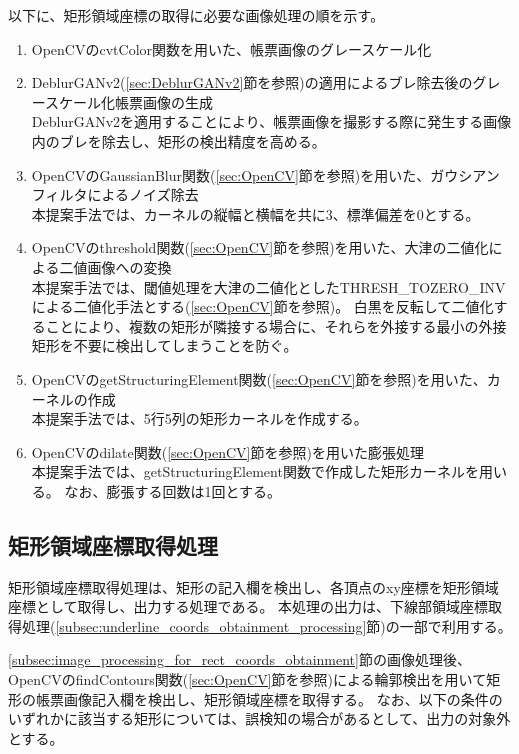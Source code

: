 以下に、矩形領域座標の取得に必要な画像処理の順を示す。

\begin{enumerate}
    \item OpenCVのcvtColor関数を用いた、帳票画像のグレースケール化
    \item DeblurGANv2(\ref{sec:DeblurGANv2}節を参照)の適用によるブレ除去後のグレースケール化帳票画像の生成\\
        DeblurGANv2を適用することにより、帳票画像を撮影する際に発生する画像内のブレを除去し、矩形の検出精度を高める。
    \item OpenCVのGaussianBlur関数(\ref{sec:OpenCV}節を参照)を用いた、ガウシアンフィルタによるノイズ除去\\
        本提案手法では、カーネルの縦幅と横幅を共に3、標準偏差を0とする。
    \item OpenCVのthreshold関数(\ref{sec:OpenCV}節を参照)を用いた、大津の二値化による二値画像への変換\\
        本提案手法では、閾値処理を大津の二値化としたTHRESH\_TOZERO\_INVによる二値化手法とする(\ref{sec:OpenCV}節を参照)。
        白黒を反転して二値化することにより、複数の矩形が隣接する場合に、それらを外接する最小の外接矩形を不要に検出してしまうことを防ぐ。
    \item OpenCVのgetStructuringElement関数(\ref{sec:OpenCV}節を参照)を用いた、カーネルの作成\\
        本提案手法では、5行5列の矩形カーネルを作成する。
    \item OpenCVのdilate関数(\ref{sec:OpenCV}節を参照)を用いた膨張処理\\
        本提案手法では、getStructuringElement関数で作成した矩形カーネルを用いる。
        なお、膨張する回数は1回とする。
\end{enumerate}


\subsection{矩形領域座標取得処理}\label{subsec:rect_coords_obtainment_processing}
矩形領域座標取得処理は、矩形の記入欄を検出し、各頂点のxy座標を矩形領域座標として取得し、出力する処理である。
本処理の出力は、下線部領域座標取得処理(\ref{subsec:underline_coords_obtainment_processing}節)の一部で利用する。

\ref{subsec:image_processing_for_rect_coords_obtainment}節の画像処理後、OpenCVのfindContours関数(\ref{sec:OpenCV}節を参照)による輪郭検出を用いて矩形の帳票画像記入欄を検出し、矩形領域座標を取得する。
なお、以下の条件のいずれかに該当する矩形については、誤検知の場合があるとして、出力の対象外とする。


